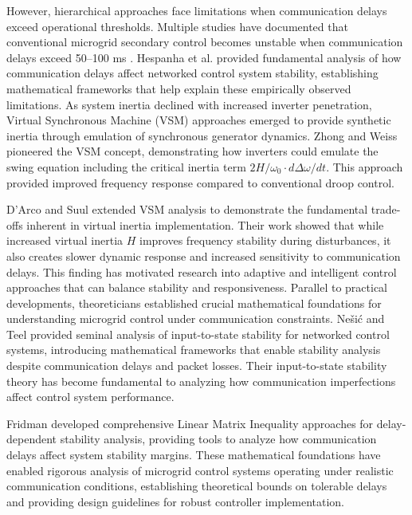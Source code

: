 \documentclass[12pt]{article}
\begin{document}
However, hierarchical approaches face limitations when communication delays exceed operational thresholds. Multiple studies have documented that conventional microgrid secondary control becomes unstable when communication delays exceed 50--100 ms \cite{guo2015,bidram2012,simpson2013}. Hespanha et al. \cite{hespanha2007} provided fundamental analysis of how communication delays affect networked control system stability, establishing mathematical frameworks that help explain these empirically observed limitations. As system inertia declined with increased inverter penetration, Virtual Synchronous Machine (VSM) approaches emerged to provide synthetic inertia through emulation of synchronous generator dynamics. Zhong and Weiss \cite{zhong2011} pioneered the VSM concept, demonstrating how inverters could emulate the swing equation including the critical inertia term $2H/\omega_0 \cdot d\Delta\omega/dt$. This approach provided improved frequency response compared to conventional droop control.

D'Arco and Suul \cite{darco2013} extended VSM analysis to demonstrate the fundamental trade-offs inherent in virtual inertia implementation. Their work showed that while increased virtual inertia $H$ improves frequency stability during disturbances, it also creates slower dynamic response and increased sensitivity to communication delays. This finding has motivated research into adaptive and intelligent control approaches that can balance stability and responsiveness. Parallel to practical developments, theoreticians established crucial mathematical foundations for understanding microgrid control under communication constraints. Nešić and Teel \cite{nesic2004} provided seminal analysis of input-to-state stability for networked control systems, introducing mathematical frameworks that enable stability analysis despite communication delays and packet losses. Their input-to-state stability theory has become fundamental to analyzing how communication imperfections affect control system performance.

Fridman \cite{fridman2014} developed comprehensive Linear Matrix Inequality approaches for delay-dependent stability analysis, providing tools to analyze how communication delays affect system stability margins. These mathematical foundations have enabled rigorous analysis of microgrid control systems operating under realistic communication conditions, establishing theoretical bounds on tolerable delays and providing design guidelines for robust controller implementation.
\end{document}
